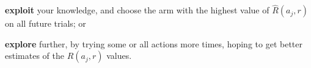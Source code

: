 \documentclass[10pt,oneside]{book}
\begin{document}
\pagestyle{empty}
\thispagestyle{empty}

\begin{description}
\item{\bf exploit} your knowledge, and choose the arm with the highest
  value of $\hat{R}(a_j, r)$ on all future trials; or 
\item{\bf explore} further, by trying some or all actions more times,
  hoping to get better estimates of the $R(a_j, r)$ values.
\end{description}
\end{document}
